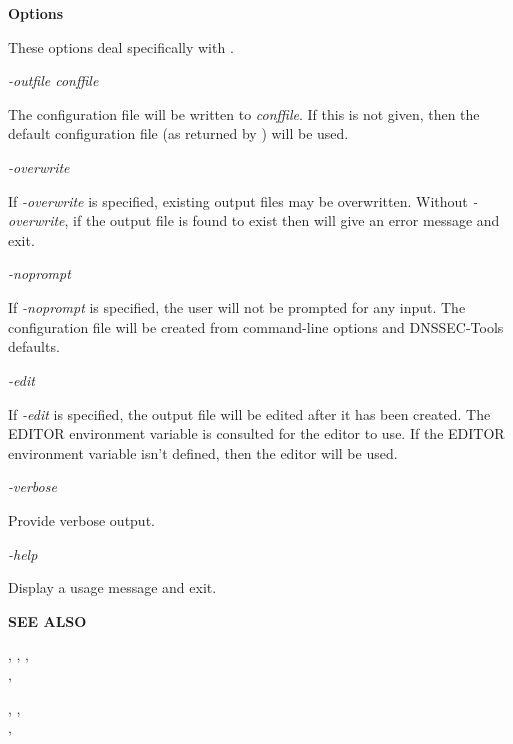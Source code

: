 {\bf {} Options}

These options deal specifically with .

\begin{description}

\item {\it -outfile conffile}\verb" "

The configuration file will be written to {\it conffile}.  If this
is not given, then the default configuration file (as returned by
) will be used.

\item {\it -overwrite}\verb" "

If {\it -overwrite} is specified, existing output files may be overwritten.
Without {\it -overwrite}, if the output file is found to exist then
 will give an error message and exit.

\item {\it -noprompt}\verb" "

If {\it -noprompt} is specified, the user will not be prompted for any input.
The configuration file will be created from command-line options and
DNSSEC-Tools defaults.

\item {\it -edit}\verb" "

If {\it -edit} is specified, the output file will be edited after it has been
created.  The EDITOR environment variable is consulted for the editor to
use.  If the EDITOR environment variable isn't defined, then the 
editor will be used.

\item {\it -verbose}\verb" "

Provide verbose output.

\item {\it -help}\verb" "

Display a usage message and exit.

\end{description}

{\bf SEE ALSO}

,
,
, \\
,

,
, \\
,

